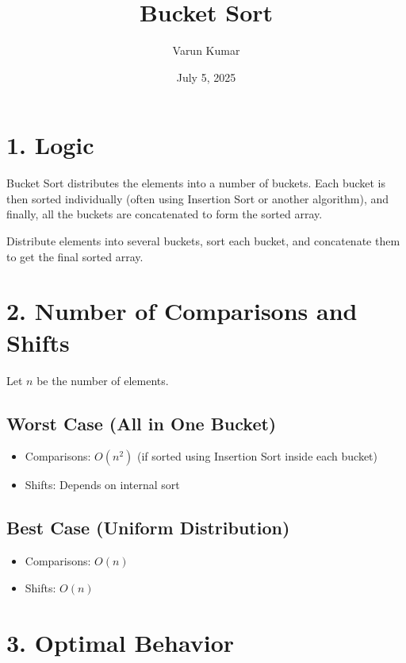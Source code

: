 \documentclass[14pt]{extarticle}
\title{\textbf{Bucket Sort}}
\author{Varun Kumar}
\date{July 5, 2025}
\begin{document}
\maketitle

\section*{1. Logic}

Bucket Sort distributes the elements into a number of buckets. Each bucket is then sorted individually (often using Insertion Sort or another algorithm), and finally, all the buckets are concatenated to form the sorted array.

\begin{tcolorbox}[
  colback=white,
  colframe=black,
  title=Key Idea
]
Distribute elements into several buckets, sort each bucket, and concatenate them to get the final sorted array.
\end{tcolorbox}

\section*{2. Number of Comparisons and Shifts}

Let $n$ be the number of elements.

\subsection*{Worst Case (All in One Bucket)}

\begin{itemize}
    \item Comparisons: $O(n^2)$ (if sorted using Insertion Sort inside each bucket)
    \item Shifts: Depends on internal sort
\end{itemize}

\subsection*{Best Case (Uniform Distribution)}

\begin{itemize}
    \item Comparisons: $O(n)$
    \item Shifts: $O(n)$
\end{itemize}

\section*{3. Optimal Behavior}
\end{document}
